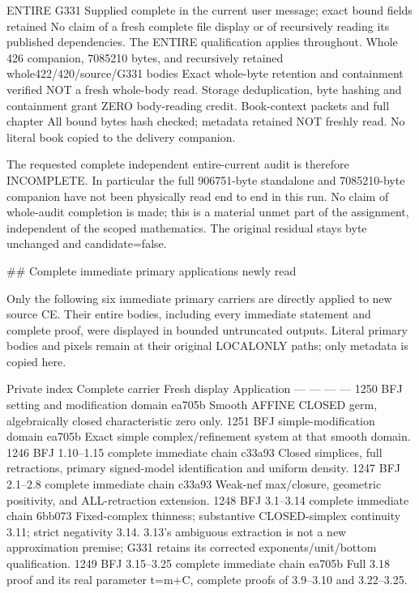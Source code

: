 \documentclass[11pt]{article}
\begin{document}
\textbar{} ENTIRE G331 \textbar{} Supplied complete in the current user message; exact bound fields retained \textbar{} No claim of a fresh complete file display or of recursively reading its published dependencies. The ENTIRE qualification applies throughout. \textbar{}
\textbar{} Whole 426 companion, 7085210 bytes, and recursively retained whole422/420/source/G331 bodies \textbar{} Exact whole-byte retention and containment verified \textbar{} NOT a fresh whole-body read. Storage deduplication, byte hashing and containment grant ZERO body-reading credit. \textbar{}
\textbar{} Book-context packets and full chapter \textbar{} All bound bytes hash checked; metadata retained \textbar{} NOT freshly read. No literal book copied to the delivery companion. \textbar{}

The requested complete independent entire-current audit is therefore INCOMPLETE. In particular the full 906751-byte standalone and 7085210-byte companion have not been physically read end to end in this run. No claim of whole-audit completion is made; this is a material unmet part of the assignment, independent of the scoped mathematics. The original residual stays byte unchanged and candidate=false.

\#\# Complete immediate primary applications newly read

Only the following six immediate primary carriers are directly applied to new source CE. Their entire bodies, including every immediate statement and complete proof, were displayed in bounded untruncated outputs. Literal primary bodies and pixels remain at their original LOCALONLY paths; only metadata is copied here.

\textbar{} Private index \textbar{} Complete carrier \textbar{} Fresh display \textbar{} Application \textbar{}
\textbar{} --- \textbar{} --- \textbar{} --- \textbar{} --- \textbar{}
\textbar{} 1250 \textbar{} BFJ setting and modification domain \textbar{} ea705b \textbar{} Smooth AFFINE CLOSED germ, algebraically closed characteristic zero only. \textbar{}
\textbar{} 1251 \textbar{} BFJ simple-modification domain \textbar{} ea705b \textbar{} Exact simple complex/refinement system at that smooth domain. \textbar{}
\textbar{} 1246 \textbar{} BFJ 1.10--1.15 complete immediate chain \textbar{} c33a93 \textbar{} Closed simplices, full retractions, primary signed-model identification and uniform density. \textbar{}
\textbar{} 1247 \textbar{} BFJ 2.1--2.8 complete immediate chain \textbar{} c33a93 \textbar{} Weak-nef max/closure, geometric positivity, and ALL-retraction extension. \textbar{}
\textbar{} 1248 \textbar{} BFJ 3.1--3.14 complete immediate chain \textbar{} 6bb073 \textbar{} Fixed-complex thinness; substantive CLOSED-simplex continuity 3.11; strict negativity 3.14. 3.13's ambiguous extraction is not a new approximation premise; G331 retains its corrected exponents/unit/bottom qualification. \textbar{}
\textbar{} 1249 \textbar{} BFJ 3.15--3.25 complete immediate chain \textbar{} ea705b \textbar{} Full 3.18 proof and its real parameter t=m+C, complete proofs of 3.9--3.10 and 3.22--3.25. \textbar{}
\end{document}
